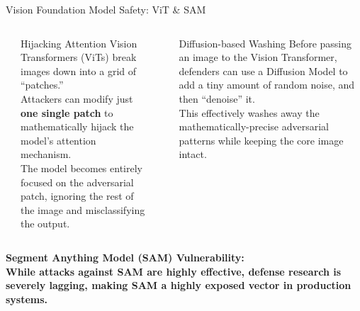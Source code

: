 \begin{frame}{Vision Foundation Model Safety: ViT \& SAM}
  \vspace{0.5em}
  \begin{columns}[T]
    {\small\bfseries{}}
    \begin{ucrcard}[UCRnavy]{Hijacking Attention}
      \scriptsize
      Vision Transformers (ViTs) break images down into a grid of ``patches.''\\
      Attackers can modify just \textbf{one single patch} to mathematically hijack the model's attention mechanism.\\
      The model becomes entirely focused on the adversarial patch, ignoring the rest of the image and misclassifying the output.
    \end{ucrcard}

    {\small\bfseries{}}
    \begin{ucrcard}[UCRnavy]{Diffusion-based Washing}
      \scriptsize
      Before passing an image to the Vision Transformer, defenders can use a Diffusion Model to add a tiny amount of random noise, and then ``denoise'' it.\\
      This effectively washes away the mathematically-precise adversarial patterns while keeping the core image intact.
    \end{ucrcard}
  \end{columns}
  
  \vspace{1em}
  \begin{ucrinfo}
    \centering\scriptsize\bfseries
    Segment Anything Model (SAM) Vulnerability:\\[2pt]
    \normalfont\scriptsize
    While attacks against SAM are highly effective, defense research is severely lagging, making SAM a highly exposed vector in production systems.
  \end{ucrinfo}
\end{frame}


